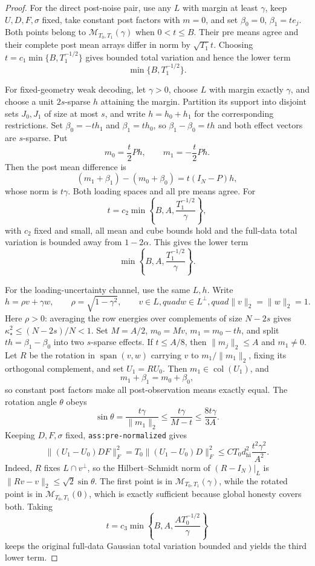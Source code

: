 \documentclass{article}
\begin{document}
\begin{proof}
For the direct post-noise pair, use any \(L\) with margin at least \(\gamma\), keep \(U,D,F,\sigma\) fixed, take constant post factors with \(m=0\), and set \(\beta_0=0\), \(\beta_1=t e_j\).  Both points belong to \(\mathcal M_{T_0,T_1}(\gamma)\) when \(0<t\le B\).  Their pre means agree and their complete post mean arrays differ in norm by \(\sqrt{T_1}t\).  Choosing \(t=c_1\min\{B,T_1^{-1/2}\}\) gives bounded total variation and hence the lower term
\[
 \min\{B,T_1^{-1/2}\}.
\]

For fixed-geometry weak decoding, let \(\gamma>0\), choose \(L\) with margin exactly \(\gamma\), and choose a unit \(2s\)-sparse \(h\) attaining the margin.  Partition its support into disjoint sets \(J_0,J_1\) of size at most \(s\), and write \(h=h_0+h_1\) for the corresponding restrictions.  Set \(\beta_0=-th_1\) and \(\beta_1=th_0\), so \(\beta_1-\beta_0=th\) and both effect vectors are \(s\)-sparse.  Put
\[
 m_0=\frac t2Ph,
 \qquad m_1=-\frac t2Ph.
\]
Then the post mean difference is
\[
 (m_1+\beta_1)-(m_0+\beta_0)=t(I_N-P)h,
\]
whose norm is \(t\gamma\).  Both loading spaces and all pre means agree.  For
\[
 t=c_2\min\left\{B,A,\frac{T_1^{-1/2}}{\gamma}\right\},
\]
with \(c_2\) fixed and small, all mean and cube bounds hold and the full-data total variation is bounded away from \(1-2\alpha\).  This gives the lower term
\[
 \min\left\{B,A,\frac{T_1^{-1/2}}{\gamma}\right\}.
\]

For the loading-uncertainty channel, use the same \(L,h\).  Write
\[
 h=\rho v+\gamma w,
 \qquad \rho=\sqrt{1-\gamma^2},
 \qquad v\in L,quad w\in L^\perp,quad \lVert v\rVert_2=\lVert w\rVert_2=1.
\]
Here \(\rho>0\): averaging the row energies over complements of size \(N-2s\) gives \(\kappa_\star^2\le(N-2s)/N<1\).  Set \(M=A/2\), \(m_0=Mv\), \(m_1=m_0-th\), and split \(th=\beta_1-\beta_0\) into two \(s\)-sparse effects.  If \(t\le A/8\), then \(\lVert m_j\rVert_2\le A\) and \(m_1\ne0\).  Let \(R\) be the rotation in \(\operatorname{span}(v,w)\) carrying \(v\) to \(m_1/\lVert m_1\rVert_2\), fixing its orthogonal complement, and set \(U_1=RU_0\).  Then \(m_1\in\operatorname{col}(U_1)\), and
\[
 m_1+\beta_1=m_0+\beta_0,
\]
so constant post factors make all post-observation means exactly equal.  The rotation angle \(\theta\) obeys
\[
 \sin\theta=\frac{t\gamma}{\lVert m_1\rVert_2}
 \le\frac{t\gamma}{M-t}
 \le\frac{8t\gamma}{3A}.
\]
Keeping \(D,F,\sigma\) fixed, \texttt{ass:pre-normalized} gives
\[
 \lVert(U_1-U_0)DF\rVert_F^2
 =T_0\lVert(U_1-U_0)D\rVert_F^2
 \le C T_0d_{\mathrm{hi}}^2\frac{t^2\gamma^2}{A^2}.
\]
Indeed, \(R\) fixes \(L\cap v^\perp\), so the Hilbert--Schmidt norm of \((R-I_N)|_L\) is \(\lVert Rv-v\rVert_2\le\sqrt2\sin\theta\).  The first point is in \(\mathcal M_{T_0,T_1}(\gamma)\), while the rotated point is in \(\mathcal M_{T_0,T_1}(0)\), which is exactly sufficient because global honesty covers both.  Taking
\[
 t=c_3\min\left\{B,A,\frac{AT_0^{-1/2}}{\gamma}\right\}
\]
keeps the original full-data Gaussian total variation bounded and yields the third lower term.


\end{proof}
\end{document}
